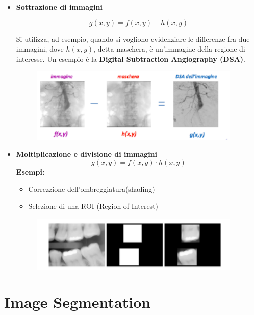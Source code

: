 \begin{itemize}
    \item \textbf{Sottrazione di immagini}

          $$
              g(x,y) = f(x,y)-h(x,y)
          $$

          Si utilizza, ad esempio, quando si vogliono evidenziare le differenze
          fra due immagini, dove $h(x,y)$, detta maschera, è un'immagine della
          regione di interesse. Un esempio è la \textbf{Digital
              Subtraction Angiography (DSA)}.
          \begin{figure}[H]
              \centering
              \includegraphics[width=10cm, keepaspectratio]{capitoli/immagini/imgs/sottrazione.png}
          \end{figure}

    \item \textbf{Moltiplicazione e divisione di immagini}
          $$
              g(x,y) = f(x,y) \cdot h(x,y)
          $$
          \textbf{Esempi:}
          \begin{itemize}
              \item Correzzione dell'ombreggiatura(shading)
              \item Selezione di una ROI (Region of Interest)
          \end{itemize}

          \begin{figure}[H]
              \centering
              \includegraphics[width=10cm, keepaspectratio]{capitoli/immagini/imgs/moltiplicazione.png}
          \end{figure}
\end{itemize}


\chapter{Image Segmentation}

